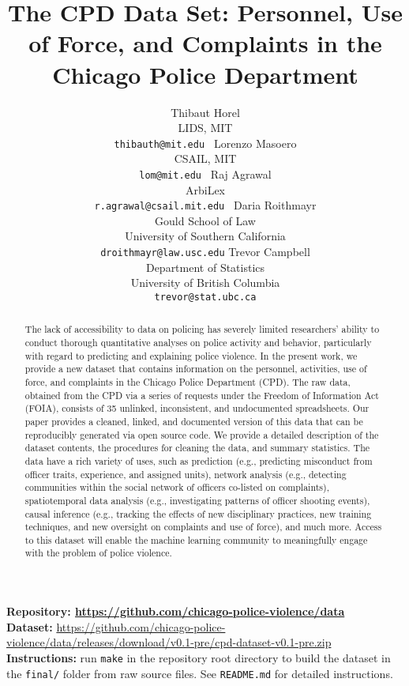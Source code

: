 \documentclass{article}
\title{The CPD Data Set: Personnel, Use of Force, and Complaints in the Chicago Police Department}
\author{%
  Thibaut Horel\\
  LIDS, MIT \\
  \texttt{thibauth@mit.edu } 
  \And
  Lorenzo Masoero\\
  CSAIL, MIT \\
  \texttt{lom@mit.edu } 
   \And
 Raj Agrawal\\
  ArbiLex\\
  \texttt{r.agrawal@csail.mit.edu } 
   \And
  Daria Roithmayr\\
  Gould School of Law \\
  University of Southern California  \\
  \texttt{droithmayr@law.usc.edu}
 \And 
 Trevor Campbell \\
  Department of Statistics \\
   University of British Columbia\\
  \texttt{trevor@stat.ubc.ca}
}
\begin{document}
\maketitle

\begin{abstract}
\relax
The lack of accessibility to data on policing has severely limited researchers'
ability to conduct thorough quantitative analyses on police activity and
behavior, particularly with regard to predicting and explaining police
violence. In the present work, we provide a new dataset that contains
information on the personnel, activities, use of force, and complaints in the
Chicago Police Department (CPD). The raw data, obtained from the CPD via a
series of requests under the Freedom of Information Act (FOIA), consists of 35
unlinked, inconsistent, and undocumented spreadsheets. Our paper provides a
cleaned, linked, and documented version of this data that can be reproducibly
generated via open source code. We provide a detailed description of the
dataset contents, the procedures for cleaning the data, and summary statistics.
The data have a rich variety of uses, such as prediction (e.g., predicting
misconduct from officer traits, experience, and assigned units), network
analysis (e.g., detecting communities within the social network of officers
co-listed on complaints), spatiotemporal data analysis (e.g., investigating
patterns of officer shooting events), causal inference (e.g., tracking the
effects of new disciplinary practices, new training techniques, and new
oversight on complaints and use of force), and much more. Access to this
dataset will enable the machine learning community to meaningfully engage with
the problem of police violence.
\end{abstract}

\textbf{Repository: \url{https://github.com/chicago-police-violence/data}}\\
\textbf{Dataset:} \url{https://github.com/chicago-police-violence/data/releases/download/v0.1-pre/cpd-dataset-v0.1-pre.zip}\\
\textbf{Instructions:} run \texttt{make} in the repository root directory to build the dataset 
in the \texttt{final/} folder from raw source files. See \texttt{README.md} for detailed instructions.\\







\end{document}
